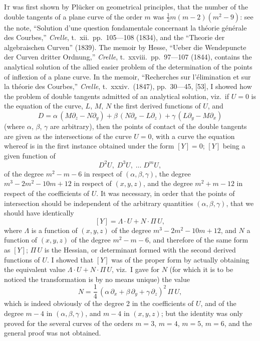 \documentclass[11pt,a4paper]{article}
\theoremstyle{plain}
\theoremstyle{definition}
\begin{document}
\textsc{It} was first shown by Pl\"{u}cker on geometrical principles, that the number of the double tangents of a plane curve of the order $m$ was $\frac{1}{2}m(m-2)(m^2-9)$: see the note, ``Solution d'une question fondamentale concernant la th\'{e}orie g\'{e}n\'{e}rale des Courbes,'' \textit{Crelle}, t.~xii.\ pp.~105---108 (1834), and the ``Theorie der algebraischen Curven'' (1839). The memoir by Hesse, ``Ueber die Wendepuncte der Curven dritter Ordnung,'' \textit{Crelle}, t.~xxviii.\ pp.~97---107 (1844), contains the analytical solution of the allied easier problem of the determination of the points of inflexion of a plane curve. In the memoir, ``Recherches sur l'\'{e}limination et sur la th\'{e}orie des Courbes,'' \textit{Crelle}, t.~xxxiv.\ (1847), pp.~30---45, [53], I showed how the problem of double tangents admitted of an analytical solution, viz.\ if $U=0$ is the equation of the curve, $L$, $M$, $N$ the first derived functions of $U$, and
\[
D = \alpha\,(M\partial_z - N\partial_y) + \beta\,(N\partial_x - L\partial_z) + \gamma\,(L\partial_y - M\partial_x)
\]
(where $\alpha$, $\beta$, $\gamma$ are arbitrary), then the points of contact of the double tangents are given as the intersections of the curve $U=0$, with a curve the equation whereof is in the first instance obtained under the form $[Y]=0$; $[Y]$ being a given function of
\[
D^2 U,\; D^3 U,\; \ldots\; D^m U,
\]
of the degree $m^2-m-6$ in respect of $(\alpha, \beta, \gamma)$, the degree $m^3-2m^2-10m+12$ in respect of $(x, y, z)$, and the degree $m^2+m-12$ in respect of the coefficients of $U$. It was necessary, in order that the points of intersection should be independent of the arbitrary quantities $(\alpha, \beta, \gamma)$, that we should have identically
\[
[Y] = \Lambda \cdot U + N \cdot \Pi\, U,
\]
where $\Lambda$ is a function of $(x, y, z)$ of the degree $m^3-2m^2-10m+12$, and $N$ a function of $(x, y, z)$ of the degree $m^2-m-6$, and therefore of the same form as $[Y]$; $\Pi\,U$ is the Hessian, or determinant formed with the second derived functions of $U$. I showed that $[Y]$ was of the proper form by actually obtaining the equivalent value $\Lambda \cdot U + N \cdot \Pi\,U$, viz.\ I gave for $N$ (for which it is to be noticed the transformation is by no means unique) the value
\[
N = \frac{1}{4}\,(\alpha\,\partial_x + \beta\,\partial_y + \gamma\,\partial_z)^2\, \Pi\,U,
\]
which is indeed obviously of the degree 2 in the coefficients of $U$, and of the degree $m-4$ in $(\alpha, \beta, \gamma)$, and $m-4$ in $(x, y, z)$; but the identity was only proved for the several curves of the orders $m=3$, $m=4$, $m=5$, $m=6$, and the general proof was not obtained.
\end{document}
